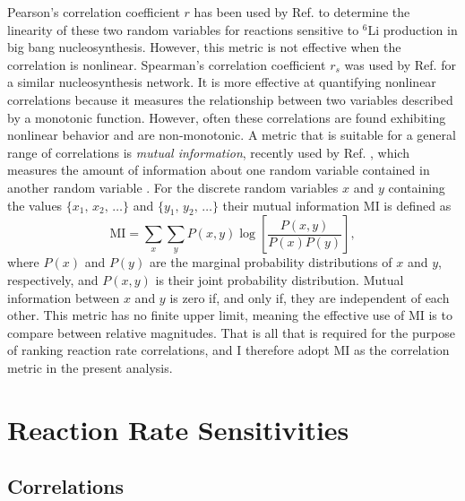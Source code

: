 Pearson's correlation coefficient $r$ has been used by Ref. \cite{Coc2014} to determine the linearity of these two random variables for reactions sensitive to $^{6}$Li production in big bang nucleosynthesis. However, this metric is not effective when the correlation is nonlinear. Spearman's correlation coefficient $r_{s}$ was used by Ref. \cite{Iliadis2015b} for a similar nucleosynthesis network. It is more effective at quantifying nonlinear correlations because it measures the relationship between two variables described by a monotonic function. However, often these correlations are found exhibiting nonlinear behavior and are non-monotonic. A metric that is suitable for a general range of correlations is \emph{mutual information}, recently used by Ref. \cite{Iliadis2020}, which measures the amount of information about one random variable contained in another random variable \cite{Cover2006}. For the discrete random variables $x$ and $y$ containing the values $\{x_{1}, \, x_{2}, \, \ldots\}$ and $\{y_{1}, \, y_{2}, \, \ldots\}$ their mutual information MI is defined as
\begin{equation} \label{eqn:mutual_info}
\mathrm{MI} = \sum_{x} \sum_{y} P(x,y) \log \left[ \frac{P(x,y)}{P(x)P(y)} \right],
\end{equation}
where $P(x)$ and $P(y)$ are the marginal probability distributions of $x$ and $y$, respectively, and $P(x,y)$ is their joint probability distribution. Mutual information between $x$ and $y$ is zero if, and only if, they are independent of each other. This metric has no finite upper limit, meaning the effective use of MI is to compare between relative magnitudes. That is all that is required for the purpose of ranking reaction rate correlations, and I therefore adopt MI as the correlation metric in the present analysis.

\section{Reaction Rate Sensitivities} \label{sec:rate_sensitivities}

\subsection{Correlations} \label{subsec:Corr}

